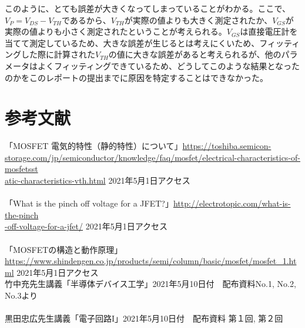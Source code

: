 \documentclass[a4j,dvipdfmx,titlepage]{article}
\begin{document}
このように、とても誤差が大きくなってしまっていることがわかる。ここで、$V_{P} = V_{DS} - V_{TH}$であるから、$V_{TH}$が実際の値よりも大きく測定されたか、$V_{GS}$が実際の値よりも小さく測定されたということが考えられる。$V_{GS}$は直接電圧計を当てて測定しているため、大きな誤差が生じるとは考えにくいため、フィッティングした際に計算された$V_{TH}$の値に大きな誤差があると考えられるが、他のパラメータはよくフィッティングできているため、どうしてこのような結果となったのかをこのレポートの提出までに原因を特定することはできなかった。

\section{参考文献}
「MOSFET 電気的特性（静的特性）について」\url{https://toshiba.semicon-storage.com/jp/semiconductor/knowledge/faq/mosfet/electrical-characteristics-of-mosfetsst}\\\url{atic-characteristics-vth.html} 2021年5月1日アクセス\\~\\
「What is the pinch off voltage for a JFET?」\url{http://electrotopic.com/what-is-the-pinch}\\\url{-off-voltage-for-a-jfet/} 2021年5月1日アクセス\\~\\
「MOSFETの構造と動作原理」 \url{https://www.shindengen.co.jp/products/semi/column/basic/mosfet/mosfet_1.html} 2021年5月1日アクセス\\
竹中充先生講義「半導体デバイス工学」2021年5月10日付　配布資料No.1, No.2, No.3より\\~\\
黒田忠広先生講義「電子回路I」2021年5月10日付　配布資料 第１回, 第２回
\end{document}
